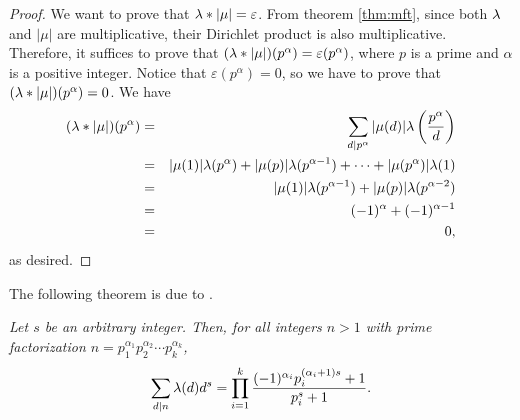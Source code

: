 \documentclass[12pt]{subfile}
\begin{document}
		\begin{proof}
			We want to prove that $\lambda \ast |\mu| = \varepsilon$. From theorem \eqref{thm:mft}, since both $\lambda$ and $|\mu|$ are multiplicative, their Dirichlet product is also multiplicative. Therefore, it suffices to prove that $(\lambda \ast |\mu|)(p^\alpha)=\varepsilon(p^\alpha )$, where $p$ is a prime and $\alpha$ is a positive integer. Notice that $\varepsilon(p^\alpha ) = 0$, so we have to prove that $(\lambda \ast |\mu|)(p^\alpha)=0$. We have
				\begin{eqnarray*}
					(\lambda \ast |\mu|)(p^\alpha) 
						&=& \sum_{d|p^\alpha} |\mu(d)| \lambda \left(\frac{p^\alpha}{d}\right)\\
						&=& |\mu(1)|\lambda(p^{\alpha}) + |\mu(p)|\lambda(p^{\alpha -1}) + \cdots + |\mu(p^{\alpha})| \lambda(1)\\
						&=& |\mu(1)|\lambda(p^{\alpha-1}) + |\mu(p)|\lambda(p^{\alpha -2})\\
						&=& (-1)^{\alpha} + (-1)^{\alpha -1}\\
						&=& 0, 
				\end{eqnarray*}
			as desired.
		\end{proof}
	The following theorem is due to \cite{ch:arithfunc-sierpinski}.	
	
		\begin{theorem}\slshape\label{thm:liouville-sum-general}
			Let $s$ be an arbitrary integer. Then, for all integers $n >1$ with prime factorization $n= p_1^{\alpha_1} p_2^{\alpha_2} \cdots p_k^{\alpha_k}$, 
				\begin{align*}
					\sum_{d|n} \lambda (d) d^s = \prod_{i=1}^{k} \frac{(-1)^{\alpha_i} p_i^{(\alpha_i+1)s} + 1}{p_i^s + 1}.
				\end{align*}
		\end{theorem}
		
\end{document}
